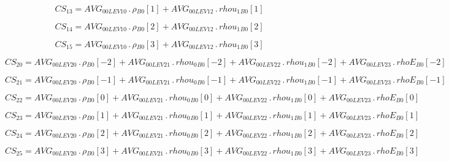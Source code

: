 \documentclass{article}
\begin{document}
\begin{dmath}CS_{13} = AVG_{0 0 LEV 10} \,.\, {\rho{_{B0}}}[{1}] + AVG_{0 0 LEV 12} \,.\, {rhou_{1}{_{B0}}}[{1}]\end{dmath}

\begin{dmath}CS_{14} = AVG_{0 0 LEV 10} \,.\, {\rho{_{B0}}}[{2}] + AVG_{0 0 LEV 12} \,.\, {rhou_{1}{_{B0}}}[{2}]\end{dmath}

\begin{dmath}CS_{15} = AVG_{0 0 LEV 10} \,.\, {\rho{_{B0}}}[{3}] + AVG_{0 0 LEV 12} \,.\, {rhou_{1}{_{B0}}}[{3}]\end{dmath}

\begin{dmath}CS_{20} = AVG_{0 0 LEV 20} \,.\, {\rho{_{B0}}}[{-2}] + AVG_{0 0 LEV 21} \,.\, {rhou_{0}{_{B0}}}[{-2}] + AVG_{0 0 LEV 22} \,.\, {rhou_{1}{_{B0}}}[{-2}] + AVG_{0 0 LEV 23} \,.\, {rhoE{_{B0}}}[{-2}]\end{dmath}

\begin{dmath}CS_{21} = AVG_{0 0 LEV 20} \,.\, {\rho{_{B0}}}[{-1}] + AVG_{0 0 LEV 21} \,.\, {rhou_{0}{_{B0}}}[{-1}] + AVG_{0 0 LEV 22} \,.\, {rhou_{1}{_{B0}}}[{-1}] + AVG_{0 0 LEV 23} \,.\, {rhoE{_{B0}}}[{-1}]\end{dmath}

\begin{dmath}CS_{22} = AVG_{0 0 LEV 20} \,.\, {\rho{_{B0}}}[{0}] + AVG_{0 0 LEV 21} \,.\, {rhou_{0}{_{B0}}}[{0}] + AVG_{0 0 LEV 22} \,.\, {rhou_{1}{_{B0}}}[{0}] + AVG_{0 0 LEV 23} \,.\, {rhoE{_{B0}}}[{0}]\end{dmath}

\begin{dmath}CS_{23} = AVG_{0 0 LEV 20} \,.\, {\rho{_{B0}}}[{1}] + AVG_{0 0 LEV 21} \,.\, {rhou_{0}{_{B0}}}[{1}] + AVG_{0 0 LEV 22} \,.\, {rhou_{1}{_{B0}}}[{1}] + AVG_{0 0 LEV 23} \,.\, {rhoE{_{B0}}}[{1}]\end{dmath}

\begin{dmath}CS_{24} = AVG_{0 0 LEV 20} \,.\, {\rho{_{B0}}}[{2}] + AVG_{0 0 LEV 21} \,.\, {rhou_{0}{_{B0}}}[{2}] + AVG_{0 0 LEV 22} \,.\, {rhou_{1}{_{B0}}}[{2}] + AVG_{0 0 LEV 23} \,.\, {rhoE{_{B0}}}[{2}]\end{dmath}

\begin{dmath}CS_{25} = AVG_{0 0 LEV 20} \,.\, {\rho{_{B0}}}[{3}] + AVG_{0 0 LEV 21} \,.\, {rhou_{0}{_{B0}}}[{3}] + AVG_{0 0 LEV 22} \,.\, {rhou_{1}{_{B0}}}[{3}] + AVG_{0 0 LEV 23} \,.\, {rhoE{_{B0}}}[{3}]\end{dmath}
\end{document}
